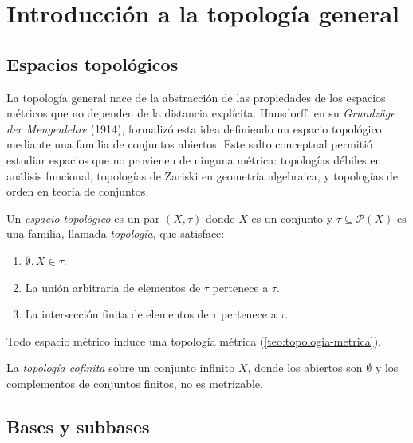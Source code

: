 \chapter{Introducción a la topología general}
\label{ch:topologia-general}

\section{Espacios topológicos}

La topología general nace de la abstracción de las propiedades de los espacios métricos que no dependen de la distancia explícita. Hausdorff, en su \emph{Grundzüge der Mengenlehre} (1914), formalizó esta idea definiendo un espacio topológico mediante una familia de conjuntos abiertos. Este salto conceptual permitió estudiar espacios que no provienen de ninguna métrica: topologías débiles en análisis funcional, topologías de Zariski en geometría algebraica, y topologías de orden en teoría de conjuntos.

\begin{definition}
\label{def:espacio-topologico}
Un \emph{espacio topológico} es un par $(X,\tau)$ donde $X$ es un conjunto y $\tau\subseteq\mathcal{P}(X)$ es una familia, llamada \emph{topología}, que satisface:
\begin{enumerate}
  \item[(T1)] $\emptyset,X\in\tau$.
  \item[(T2)] La unión arbitraria de elementos de $\tau$ pertenece a $\tau$.
  \item[(T3)] La intersección finita de elementos de $\tau$ pertenece a $\tau$.
\end{enumerate}
\end{definition}

\begin{example}
\label{ej:metrico-topologico}
Todo espacio métrico induce una topología métrica (\cref{teo:topologia-metrica}).
\end{example}

\begin{example}
\label{ej:cofinita}
La \emph{topología cofinita} sobre un conjunto infinito $X$, donde los abiertos son $\emptyset$ y los complementos de conjuntos finitos, no es metrizable.
\end{example}

\section{Bases y subbases}

